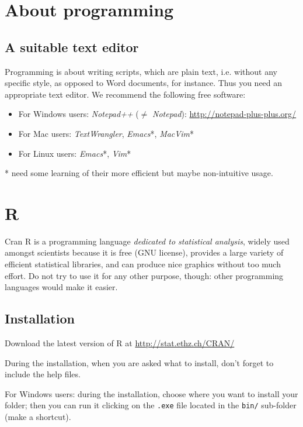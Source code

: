 \documentclass[a4paper,11pt]{article}
\begin{document}
\clearpage

\section{About programming}
\subsection{A suitable text editor}
Programming is about writing scripts, which are plain text, i.e. without any specific style, as opposed to Word documents, for instance. Thus you need an appropriate text editor. We recommend the following free software:

\begin{itemize}
\item For Windows users: {\it Notepad++} ($\ne$ {\it Notepad}): \url{http://notepad-plus-plus.org/}
\item For Mac users: {\it TextWrangler}, {\it Emacs}*, {\it MacVim}*
\item For Linux users: {\it Emacs}*, {\it Vim}*
\end{itemize}
* need some learning of their more efficient but maybe non-intuitive usage.

\section{R}
Cran R is a programming language {\it dedicated to statistical analysis}, widely used amongst scientists
because it is free (GNU license), provides a large variety of efficient statistical libraries, and can produce 
nice graphics without too much effort. Do not try to use it for any other purpose, though: other programming languages 
would make it easier.

\subsection{Installation}
Download the latest version of R at \url{http://stat.ethz.ch/CRAN/}

During the installation, when you are asked what to install, don't forget to include the help files.

For Windows users: during the installation, choose where you want to install your folder; then you can run it clicking on the \texttt{.exe} file located in the \texttt{bin/} sub-folder (make a shortcut).
\end{document}

